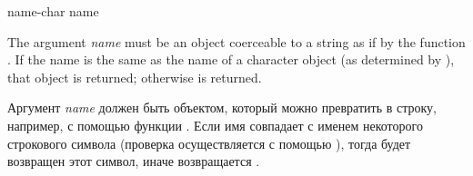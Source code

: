 \begin{defun}[Function]
name-char name

The argument \emph{name} must be an object coerceable to a string
as if by the function .
If the name is the same as the name of a character object
(as determined by ), that object
is returned; otherwise {\false} is returned.

Аргумент \emph{name} должен быть объектом, который можно превратить в строку,
например, с помощью функции .
Если имя совпадает с именем некоторого строкового символа (проверка
осуществляется с помощью ), тогда будет
возвращен этот символ, иначе возвращается {\false}.
\end{defun}